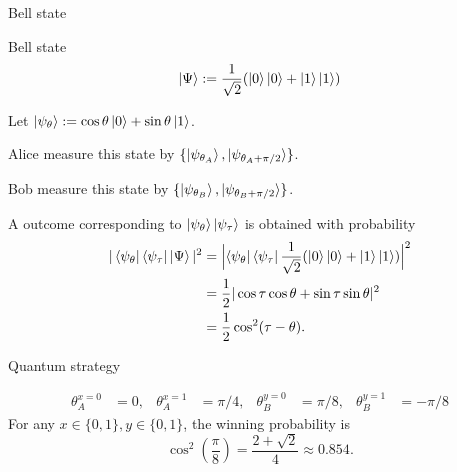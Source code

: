 \documentclass{beamer}
\begin{document}
\begin{frame}{Bell state}
\small

Bell state
\begin{equation*}
\ket{\Psi}:=
\frac1{\sqrt{2}}(\ket{0}\ket{0} + \ket{1}\ket{1})
\end{equation*}

\vspace{2em}
Let $\ket{\psi_\theta} := \cos\theta\ket{0}+\sin\theta\ket{1}$.

Alice measure this state by $\{\ket{\psi_{\theta_A}}, \ket{\psi_{\theta_A+\pi/2}}\}$.

Bob measure this state by $\{\ket{\psi_{\theta_B}}, \ket{\psi_{\theta_B+\pi/2}}\}$.

\vspace{2em}
A outcome corresponding to $\ket{\psi_\theta}\ket{\psi_\tau}$ is obtained with probability
\begin{align*}
|\bra{\psi_{\theta}}\bra{\psi_{\tau}}\ket{\Psi}|^2
&=\Bigl|\bra{\psi_{\theta}}\bra{\psi_{\tau}}
\frac1{\sqrt{2}}(\ket{0}\ket{0} + \ket{1}\ket{1})\Bigr|^2\\
&=\frac12 |\cos\tau\cos\theta + \sin\tau\sin\theta|^2\\
&=\frac12 \cos^2(\tau-\theta).
\end{align*}
\end{frame}

\begin{frame}{Quantum strategy}
\begin{center}
\end{center}
\begin{align*}
\theta_A^{x=0} &= 0, & \theta_A^{x=1} &= \pi/4, &
\theta_B^{y=0} &= \pi/8, & \theta_B^{y=1} &= -\pi/8
\end{align*}
For any $x\in\{0,1\}, y\in\{0,1\}$, the winning probability is
\begin{equation*}
\cos^2\left(\frac{\pi}8\right)
=
\frac{2+\sqrt{2}}4
\approx 0.854.
\end{equation*}
\end{frame}
\end{document}
